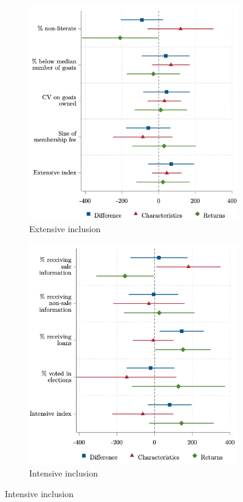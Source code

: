 \documentclass[11pt]{article}
\begin{document}
\vspace{.5cm}
\begin{figure}[H] 
\caption{Decomposition results for the cooperative loan amount} \label{figure:decomp_3}
    \centering
    \begin{subfigure}[t]{.485\textwidth}
    \centering
        \caption{Extensive inclusion} \label{figure:decomp_3_ex}
        \includegraphics[width=\linewidth,trim=4 4 4 4,clip]{decomp_3_ex.png} 
    \end{subfigure}
    \vspace{.1cm}
    \begin{subfigure}[t]{0.475\textwidth}
        \centering
        \caption{Intensive inclusion} \label{figure:decomp_3_in}
        \includegraphics[width=\linewidth,trim=4 4 4 4,clip]{decomp_3_in.png} 

\end{subfigure}
\end{figure}
\end{document}

